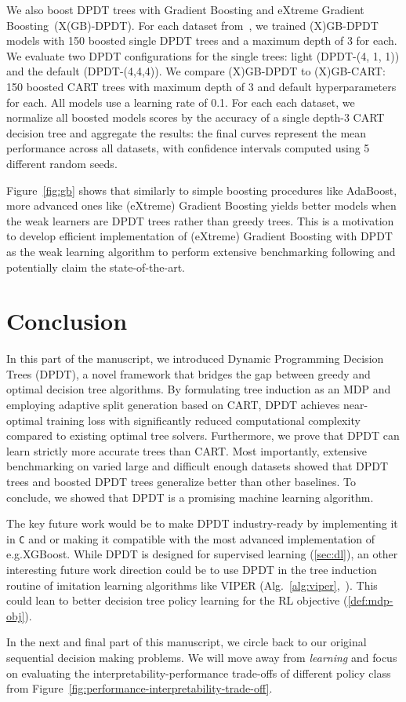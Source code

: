 We also boost DPDT trees with Gradient Boosting and eXtreme Gradient Boosting~\cite{FriedmanBoosting,stcohFriedman,xgb}(X(GB)-DPDT). For each dataset from~\cite{grinsztajn2022tree}, we trained (X)GB-DPDT models with 150 boosted single DPDT trees and a maximum depth of 3 for each. We evaluate two DPDT configurations for the single trees: light (DPDT-(4, 1, 1)) and the default (DPDT-(4,4,4)). We compare (X)GB-DPDT to (X)GB-CART: 150 boosted CART trees with maximum depth of 3 and default hyperparameters for each. All models use a learning rate of 0.1. For each each dataset, we normalize all boosted models scores by the accuracy of a single depth-3 CART decision tree and aggregate the results: the final curves represent the mean performance across all datasets, with confidence intervals computed using 5 different random seeds.

Figure~\ref{fig:gb} shows that similarly to simple boosting procedures like AdaBoost, more advanced ones like (eXtreme) Gradient Boosting yields better models when the weak learners are DPDT trees rather than greedy trees. This is a motivation to develop efficient implementation of (eXtreme) Gradient Boosting with DPDT as the weak learning algorithm to perform extensive benchmarking following \cite{grinsztajn2022tree} and potentially claim the state-of-the-art.



\section{Conclusion}

In this part of the manuscript, we introduced Dynamic Programming Decision Trees (DPDT), a novel framework that bridges the gap between greedy and optimal decision tree algorithms. By formulating tree induction as an MDP and employing adaptive split generation based on CART, DPDT achieves near-optimal training loss with significantly reduced computational complexity compared to existing optimal tree solvers. Furthermore, we prove that DPDT can learn strictly more accurate trees than CART. 
Most importantly, extensive benchmarking on varied large and difficult enough datasets showed that DPDT trees and boosted DPDT trees generalize better than other baselines. To conclude, we showed that DPDT is a promising machine learning algorithm. 

The key future work would be to make DPDT industry-ready by implementing it in \texttt{C} and or making it compatible with the most advanced implementation of e.g.\@ XGBoost.
While DPDT is designed for supervised learning (\ref{sec:dl}), an other interesting future work direction could be to use DPDT in the tree induction routine of imitation learning algorithms like VIPER (Alg.~\ref{alg:viper},~\cite{viper}).
This could lean to better decision tree policy learning for the RL objective (\ref{def:mdp-obj}).

In the next and final part of this manuscript, we circle back to our original sequential decision making problems.
We will move away from \textit{learning} and focus on evaluating the interpretability-performance trade-offs of different policy class from Figure~\ref{fig:performance-interpretability-trade-off}.
